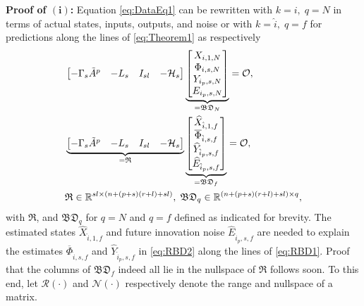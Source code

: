 \noindent\textbf{Proof of $\mathrm{\mathbf{(i)}}$:} 
Equation \eqref{eq:DataEq1} can be rewritten with $k=i,\;q=N$ in terms of actual states, inputs, outputs, and noise or with $k=\hat{i},\;q=f$ for predictions along the lines of \eqref{eq:Theorem1} as respectively
\begin{align}
    &\begin{bmatrix}-\Gamma_s \tilde{A}^p & -L_s & I_{sl}&-\mathcal{H}_s\end{bmatrix}
    \underbrace{\begin{bmatrix}
        X_{i,1,N}\\
        \Phi_{i,s,N}\\
        Y_{i_p,s,N}\\
        E_{i_p,s,N}
    \end{bmatrix}}_{=\mathfrak{BD}_N}=\mathcal{O},\label{eq:RBD1}\\
    &\underbrace{\begin{bmatrix}-\Gamma_s \tilde{A}^p & -L_s & I_{sl}&-\mathcal{H}_s\end{bmatrix}}_{= \mathfrak{R}}
    \underbrace{\begin{bmatrix}
        \widehat{X}_{\hat{i},1,f}\\
        \overline{\Phi}_{\hat{i},s,f}\\
        \widehat{Y}_{\hat{i}_p,s,f}\\
        \widehat{E}_{\hat{i}_p,s,f}
    \end{bmatrix}}_{=\mathfrak{BD}_f}=\mathcal{O},\label{eq:RBD2}\\
    &\mathfrak{R}\in\mathbb{R}^{sl\times (n+(p+s)(r+l)+sl)},\;\mathfrak{BD}_q\in\mathbb{R}^{(n+(p+s)(r+l)+sl) \times q},\notag
\end{align}
with $\mathfrak{R}$, and $\mathfrak{BD}_q$ for $q=N$ and $q=f$ defined as indicated for brevity. The estimated states $\widehat{X}_{\hat{i},1,f}$ and future innovation noise $\widehat{E}_{\hat{i}_p,s,f}$ are needed to explain the estimates $\overline{\Phi}_{\hat{i},s,f}$ and $\widehat{Y}_{\hat{i}_p,s,f}$ in \eqref{eq:RBD2} along the lines of \eqref{eq:RBD1}. Proof that the columns of $\mathfrak{BD}_f$ indeed all lie in the nullspace of $\mathfrak{R}$ follows soon. To this end, let $\mathcal{R}(\cdot)$ and $\mathcal{N}(\cdot)$ respectively denote the range and nullspace of a matrix.


